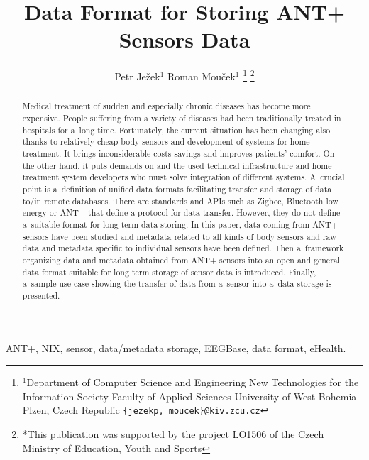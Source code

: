 \documentclass[conference]{IEEEtran}
\begin{document}
  \title{Data Format for Storing ANT+ Sensors Data}

  \author{{Petr Je\v{z}ek$^{1}$ Roman Mou\v{c}ek$^{1}$}
\thanks{$^{1}$Department of Computer Science and Engineering
New Technologies for the Information Society
Faculty of Applied Sciences
University of West Bohemia
Plzen, Czech Republic
        {\tt\small \{jezekp, moucek\}@kiv.zcu.cz}}%
\thanks{*This publication was supported by the project LO1506 of the Czech Ministry of Education, Youth and Sports}%
}
\maketitle



\begin{abstract}
  Medical treatment of sudden and especially chronic diseases has become more expensive. People suffering from a variety of diseases had been traditionally treated in hospitals for a~long time. Fortunately, the current situation has been changing also thanks to relatively cheap body sensors and development of systems for home treatment. It brings inconsiderable costs savings and improves patients' comfort. On the other hand, it puts demands on and the used technical infrastructure and home treatment system developers who must solve integration of different systems. A~crucial point is a~definition of unified data formats facilitating transfer and storage of data to/in remote databases. There are standards and APIs such as Zigbee, Bluetooth low energy or ANT+ that define a protocol for data transfer. However, they do not define a~suitable format for long term data storing. In this paper, data coming from ANT+ sensors have been studied and metadata related to all kinds of body sensors and raw data and metadata specific to individual sensors have been defined. Then a~framework organizing data and metadata obtained from ANT+ sensors into an open and general data format suitable for long term storage of sensor data is introduced. Finally, a~sample use-case showing the transfer of data from a~sensor into a~data storage is presented.



\end{abstract}

\begin{IEEEkeywords}
ANT+, NIX, sensor, data/metadata storage, EEGBase, data format, eHealth.
\end{IEEEkeywords}
\end{document}
